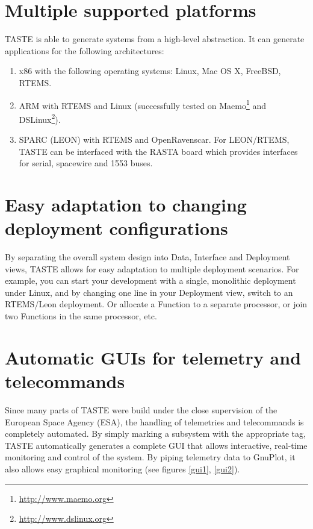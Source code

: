 \documentclass[11pt]{book}
\begin{document}
   \section{Multiple supported platforms}
   TASTE is able to generate systems from a high-level abstraction. It can
   generate applications for the following architectures:
   \begin{enumerate}
      \item
         x86 with the following operating systems: Linux, Mac OS X, FreeBSD,
         RTEMS.
      \item
         ARM with RTEMS and Linux (successfully tested on
         Maemo\footnote{\url{http://www.maemo.org}} and
         DSLinux\footnote{\url{http://www.dslinux.org}}).
      \item
         SPARC (LEON) with RTEMS and OpenRavenscar. For LEON/RTEMS, TASTE can be
         interfaced with the RASTA board which provides interfaces for serial,
         spacewire and 1553 buses.
   \end{enumerate}
   \section{Easy adaptation to changing deployment configurations}
   By separating the overall system design into Data, Interface and Deployment views,
   TASTE allows for easy adaptation to multiple deployment scenarios. For example,
   you can start your development with a single, monolithic deployment under Linux, 
   and by changing one line in your Deployment view, switch to an RTEMS/Leon deployment.
   Or allocate a Function to a separate processor, or join two Functions in the same
   processor, etc.
   \section{Automatic GUIs for telemetry and telecommands}
   Since many parts of TASTE were build under the close supervision of the European
   Space Agency (ESA), the handling of telemetries and telecommands is completely
   automated. By simply marking a subsystem with the appropriate tag, TASTE automatically
   generates a complete GUI that allows interactive, real-time monitoring and control
   of the system. By piping telemetry data to GnuPlot, it also allows easy graphical
   monitoring (see figures \ref{gui1}, \ref{gui2}).
\end{document}
